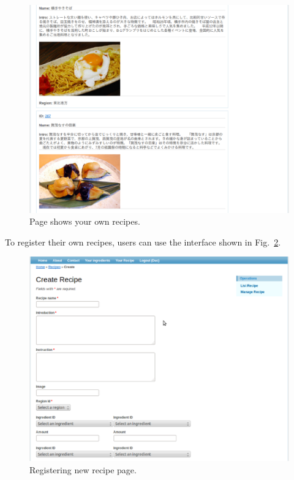\begin{figure}
\centering
\includegraphics[scale=0.5]{your_recipe.eps}
\caption{Page shows your own recipes.}
\label{fig:your_recipe}
\end{figure}

To register their own recipes, users can use the interface shown in Fig.~\ref{fig:register_recipe}.
 
\begin{figure}
\centering
\includegraphics[scale=0.5]{register_recipe.eps}
\caption{Registering new recipe page.}
\label{fig:register_recipe}
\end{figure}

